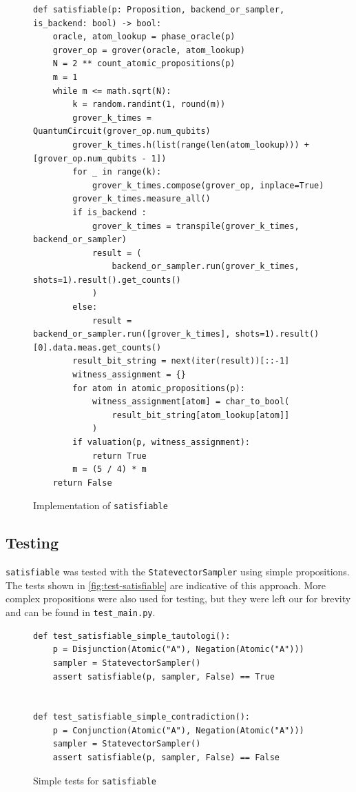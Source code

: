 \begin{figure}[H]
\centering
\begin{verbatim}
def satisfiable(p: Proposition, backend_or_sampler, is_backend: bool) -> bool:
    oracle, atom_lookup = phase_oracle(p)
    grover_op = grover(oracle, atom_lookup)
    N = 2 ** count_atomic_propositions(p)
    m = 1
    while m <= math.sqrt(N):
        k = random.randint(1, round(m))
        grover_k_times = QuantumCircuit(grover_op.num_qubits)
        grover_k_times.h(list(range(len(atom_lookup))) + [grover_op.num_qubits - 1])
        for _ in range(k):
            grover_k_times.compose(grover_op, inplace=True)
        grover_k_times.measure_all()
        if is_backend :
            grover_k_times = transpile(grover_k_times, backend_or_sampler)
            result = (
                backend_or_sampler.run(grover_k_times, shots=1).result().get_counts()
            )
        else:
            result = backend_or_sampler.run([grover_k_times], shots=1).result()[0].data.meas.get_counts()
        result_bit_string = next(iter(result))[::-1]
        witness_assignment = {}
        for atom in atomic_propositions(p):
            witness_assignment[atom] = char_to_bool(
                result_bit_string[atom_lookup[atom]]
            )
        if valuation(p, witness_assignment):
            return True
        m = (5 / 4) * m
    return False
\end{verbatim}
\caption{Implementation of \texttt{satisfiable} }
\label{fig:satisfiable}
\end{figure}

\subsection{Testing}\label{subsec:testing}

\texttt{satisfiable} was tested with the \texttt{StatevectorSampler} using simple propositions.
The tests shown in \autoref{fig:test-satisfiable} are indicative of this approach.
More complex propositions were also used for testing, but they were left our for brevity and can be found in \texttt{test\_main.py}.

\begin{figure}[H]
\centering
\begin{verbatim}
def test_satisfiable_simple_tautologi():
    p = Disjunction(Atomic("A"), Negation(Atomic("A")))
    sampler = StatevectorSampler()
    assert satisfiable(p, sampler, False) == True


def test_satisfiable_simple_contradiction():
    p = Conjunction(Atomic("A"), Negation(Atomic("A")))
    sampler = StatevectorSampler()
    assert satisfiable(p, sampler, False) == False
\end{verbatim}
\caption{Simple tests for \texttt{satisfiable}}
\label{fig:test-satisfiable}
\end{figure}

